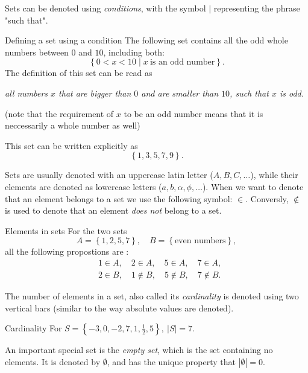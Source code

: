 Sets can be denoted using \emph{conditions}, with the symbol $|$ representing the phrase "such that".

\begin{example}{Defining a set using a condition}
	The following set contains all the odd whole numbers between $0$ and $10$, including both:
	\[
		\left\{ 0 < x < 10 \mid x\ \text{is an odd number}\right\}.
	\]
	The definition of this set can be read as

	\vspace{3mm}
	\centering
	\textit{all numbers $x$ that are bigger than $0$ and are smaller than $10$, such that $x$ is odd.}

	\flushleft{}
	(note that the requirement of $x$ to be an odd number means that it is neccessarily a whole number as well)

	\vspace{1em}
	This set can be written explicitly as
	\[
		\left\{ 1,3,5,7,9 \right\}.
	\]
\end{example}

Sets are usually denoted with an uppercase latin letter ($A,B,C,\dots$), while their elements are denoted as lowercase letters ($a,b,\alpha,\phi,\dots$). When we want to denote that an element belongs to a set we use the following symbol: $\in$. Conversly, $\notin$ is used to denote that an element \textit{does not} belong to a set.
	
\begin{example}{Elements in sets}{}
	For the two sets
	\[
		A = \left\{ 1,2,5,7 \right\},\quad B=\left\{ \text{even numbers} \right\},
	\]
	all the following propostions are \true{}:
	\begin{align*}
		&1\in A,\quad 2\in A,\quad 5\in A,\quad 7\in A,\\
		&2\in B,\quad 1\notin B,\quad 5\notin B,\quad 7\notin B.
	\end{align*}
\end{example}

The number of elements in a set, also called its \emph{cardinality} is denoted using two vertical bars (similar to the way absolute values are denoted).

\begin{example}{Cardinality}{}
	For $S=\left\{ -3,0,-2,7,1,\frac{1}{2},5 \right\},\ |S|=7$.
\end{example}

An important special set is the \emph{empty set}, which is the set containing no elements. It is denoted by $\emptyset$, and has the unique property that $|\emptyset|=0$.

